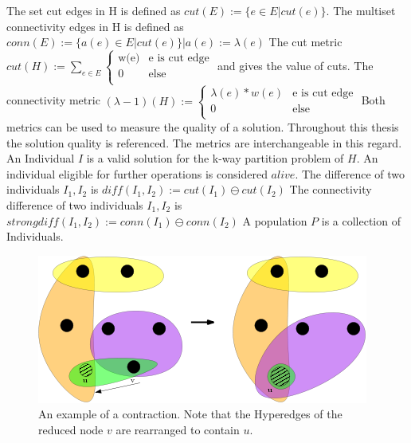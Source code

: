 \documentclass[a4paper,12pt,bibtotoc,titlepage, liststotoc,BCOR7mm,headsepline,pointlessnumbers]{scrbook}
\numberwithin{equation}{section}
\begin{document}
The set cut edges in H is defined as
$cut(E) := \{e \in E | cut(e) \}$.
The multiset connectivity edges in H is defined as
$conn(E) := \{a(e) \in E | cut(e) \} |a(e) := \lambda(e)$
The cut metric $cut(H) := \sum_{e \in E} 
\begin{cases}
       \text{w(e)} & \text{e is cut edge}\\
       \text{0} &\text{else}\\
     \end{cases}$  and gives the value of cuts.
The connectivity metric $(\lambda -1)(H) := \begin{cases}
       \text{$\lambda(e)*w(e)$} & \text{e is cut edge}\\
       \text{0} &\text{else}\\
     \end{cases}$
Both metrics can be used to measure the quality of a solution. Throughout this thesis the solution quality is referenced. The metrics are interchangeable in this regard.
An Individual $I$ is a valid solution for the k-way partition problem of $H$.
An individual eligible for further operations is considered $alive$.
The difference of two individuals $I_1, I_2$ is $diff(I_1, I_2) := cut(I_1) \ominus cut(I_2)$
The connectivity difference of two individuals $I_1, I_2$ is $strongdiff(I_1, I_2) := conn(I_1) \ominus conn(I_2)$
A population $P$ is a collection of Individuals.

\begin{figure}[t!] 
    \vspace*{-.25cm}
  \centering
   \includegraphics[width=.8\textwidth]{Ipe/img.png}
  \caption{An example of a contraction. Note that the Hyperedges of the reduced node $v$ are rearranged to contain $u$.}\label{fig:img.png}
    \vspace*{-.5cm}
\end{figure}


\end{document}
